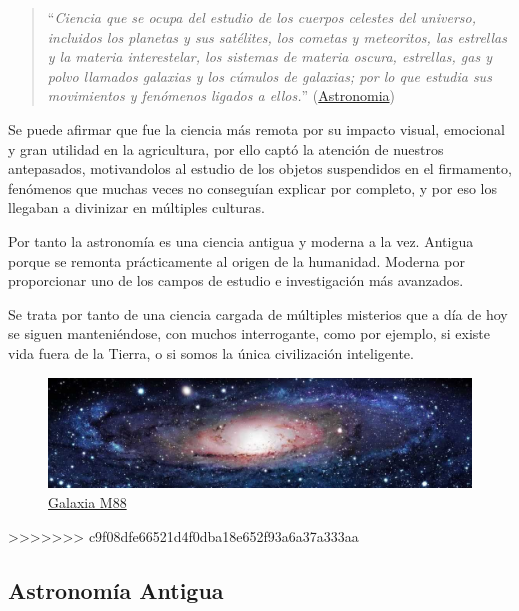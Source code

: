 \begin{quote}``\textit{Ciencia que se ocupa del estudio de los cuerpos celestes del universo, incluidos los planetas y sus satélites, los cometas y meteoritos, las estrellas y la materia interestelar,
  los sistemas de materia oscura, estrellas, gas y polvo llamados galaxias y los cúmulos de galaxias; por lo que estudia sus movimientos y fenómenos ligados a ellos.}''
\newline(\href{https://es.wikipedia.org/wiki/Astronom%C3%ADa}{Astronomia})
\end{quote}

\bigskip
Se puede afirmar que fue la ciencia más remota por su impacto visual, emocional y gran utilidad en la agricultura, por ello captó la atención de nuestros antepasados, motivandolos al estudio de los objetos suspendidos en el firmamento, fenómenos que muchas veces no conseguían explicar por completo, y por eso los llegaban a divinizar en múltiples culturas.

\bigskip
Por tanto la  astronomía es una ciencia antigua y moderna a la vez. \newline
Antigua porque se remonta prácticamente al origen de la humanidad.\newline
Moderna por proporcionar uno de los campos de estudio e investigación más avanzados.

\bigskip
Se trata por tanto de una ciencia cargada de múltiples misterios que a día de hoy se siguen manteniéndose, con muchos interrogante, como por ejemplo,  si existe vida fuera de la Tierra, o si somos la única civilización
inteligente.


\begin{figure}[b]
\centering
\includegraphics[width=0.9\linewidth]{../images/astrofooter}
\caption[Galaxia M88]{\href{https://commons.wikimedia.org/wiki/File:Messier_88_galaxy.jpg}{Galaxia M88}}
\label{fig:astrofooter}
\end{figure}
>>>>>>> c9f08dfe66521d4f0dba18e652f93a6a37a333aa


\subsection{Astronomía Antigua}

